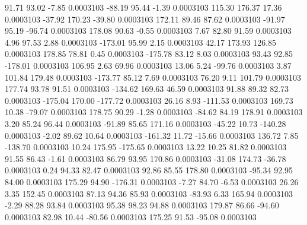        91.71       93.02       -7.85     0.0003103
      -88.19       95.44       -1.39     0.0003103
      115.30      176.37       17.36     0.0003103
      -37.92      170.23      -39.80     0.0003103
      172.11       89.46       87.62     0.0003103
      -91.97       95.19      -96.74     0.0003103
      178.08       90.63       -0.55     0.0003103
        7.67       82.80       91.59     0.0003103
        4.96       97.53        2.88     0.0003103
     -173.01       95.99        2.15     0.0003103
       42.17      173.93      126.85     0.0003103
      178.85       78.81        0.45     0.0003103
     -175.78       83.12        8.03     0.0003103
       93.43       92.85     -178.01     0.0003103
      106.95        2.63       69.96     0.0003103
       13.06        5.24      -99.76     0.0003103
        3.87      101.84      179.48     0.0003103
     -173.77       85.12        7.69     0.0003103
       76.20        9.11      101.79     0.0003103
      177.74       93.78       91.51     0.0003103
     -134.62      169.63       46.59     0.0003103
       91.88       89.32       82.73     0.0003103
     -175.04      170.00     -177.72     0.0003103
       26.16        8.93     -111.53     0.0003103
      169.73       10.38      -79.07     0.0003103
      178.75       90.29       -1.28     0.0003103
      -84.62       84.19      178.91     0.0003103
        3.20       85.24       96.44     0.0003103
      -91.89       85.65      171.16     0.0003103
      -45.22       10.73     -140.28     0.0003103
       -2.02       89.62       10.64     0.0003103
     -161.32       11.72      -15.66     0.0003103
      136.72        7.85     -138.70     0.0003103
       10.24      175.95     -175.65     0.0003103
       13.22       10.25       81.82     0.0003103
       91.55       86.43       -1.61     0.0003103
       86.79       93.95      170.86     0.0003103
      -31.08      174.73      -36.78     0.0003103
        0.24       94.33       82.47     0.0003103
       92.86       85.55      178.80     0.0003103
      -95.34       92.95       84.00     0.0003103
      175.29       94.90     -176.31     0.0003103
       -7.27       84.70       -6.53     0.0003103
       26.26        3.35      152.45     0.0003103
       87.13       94.36       85.93     0.0003103
      -83.93        6.33      165.94     0.0003103
       -2.29       88.28       93.84     0.0003103
       95.38       98.23       94.88     0.0003103
      179.87       86.66      -94.60     0.0003103
       82.98       10.44      -80.56     0.0003103
      175.25       91.53      -95.08     0.0003103
